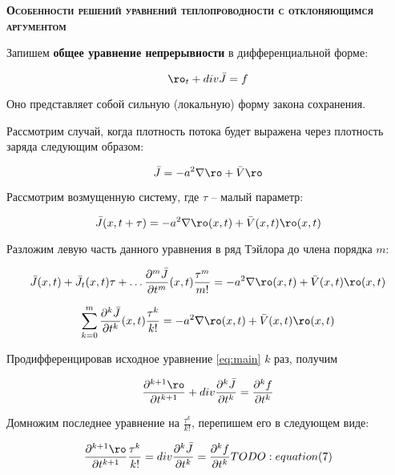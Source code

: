 \begin{center}
\textsc{\textbf{Особенности решений уравнений теплопроводности с отклоняющимся аргументом\\}}
\end{center}

Запишем \textbf{общее уравнение непрерывности} в дифференциальной форме:

\begin{equation}\label{eq:main}
\ro_t + div \bar{J} = f
\end{equation}

Оно представляет собой сильную (локальную) форму закона сохранения.

Рассмотрим случай, когда плотность потока будет выражена через плотность заряда следующим образом:

\begin{equation}
\bar{J} = -a^2 \nabla \ro + \bar{V} \ro
\end{equation}

Рассмотрим возмущенную систему, где $\tau$ \--- малый параметр:

\begin{equation*}
\bar{J}(x,t+\tau) = -a^2 \nabla \ro(x,t) + \bar{V}(x,t) \ro(x,t)
\end{equation*}

Разложим левую часть данного уравнения в ряд Тэйлора до члена порядка $m$:

\begin{equation*}
\bar{J}(x,t) + \bar{J_t}(x,t) \tau + \dots \dfrac{\partial^m \bar{J}}{\partial t^m}(x,t) \dfrac{\tau^m}{m!} = -a^2 \nabla \ro(x,t) + \bar{V}(x,t) \ro(x,t)
\end{equation*}

\begin{equation}\label{eq:sub}
\sum\limits_{k=0}^{m} \dfrac{\partial^k \bar{J}}{\partial t^k}(x,t) \dfrac{\tau^k}{k!} = -a^2 \nabla \ro(x,t) + \bar{V}(x,t) \ro(x,t)
\end{equation}

Продифференцировав исходное уравнение \ref{eq:main} $k$ раз, получим

\begin{equation*}
\dfrac{\partial^{k+1} \ro}{\partial t^{k+1}} + div \dfrac{\partial^k \bar{J}}{\partial t^k} = \dfrac{\partial^k f}{\partial t^k}
\end{equation*}

Домножим последнее уравнение на $\frac{\tau^k}{k!}$, перепишем его в следующем виде:

\begin{equation*}
\dfrac{\partial^{k+1} \ro}{\partial t^{k+1}} \dfrac{\tau^k}{k!} = div \dfrac{\partial^k \bar{J}}{\partial t^k} = \dfrac{\partial^k f}{\partial t^k}
TODO: equation (7)
\end{equation*}
